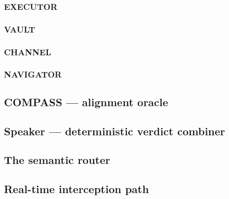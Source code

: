 \documentclass[11pt]{article}
\begin{document}
\subsubsection{EXECUTOR}

\subsubsection{VAULT}

\subsubsection{CHANNEL}

\subsubsection{NAVIGATOR}

\subsection{COMPASS — alignment oracle}

\subsection{Speaker — deterministic verdict combiner}

\subsection{The semantic router}

\subsection{Real-time interception path}
\end{document}
